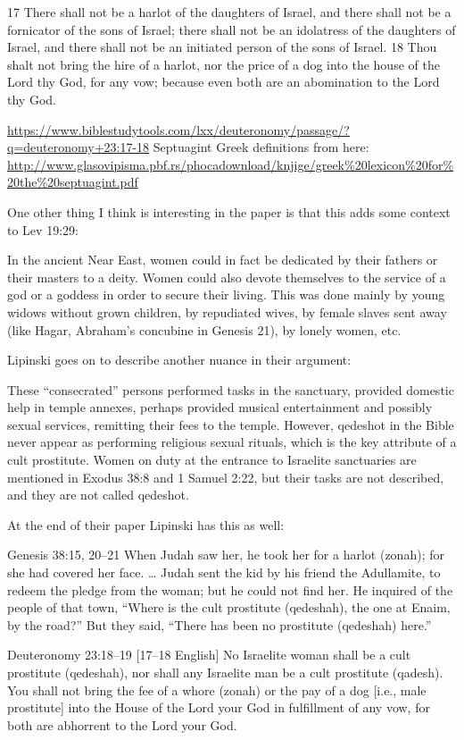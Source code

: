 \documentclass[11pt]{article}
\begin{document}
{17 There shall not be a harlot of the daughters of Israel, and there shall not be a fornicator of the sons of Israel; there shall not be an idolatress of the daughters of Israel, and there shall not be an initiated person of the sons of Israel. 18 Thou shalt not bring the hire of a harlot, nor the price of a dog into the house of the Lord thy God, for any vow; because even both are an abomination to the Lord thy God.

\url{https://www.biblestudytools.com/lxx/deuteronomy/passage/?q=deuteronomy+23:17-18}
Septuagint Greek definitions from here: \url{http://www.glasovipisma.pbf.rs/phocadownload/knjige/greek%20lexicon%20for%20the%20septuagint.pdf}

One other thing I think is interesting in the paper is that this adds some context to Lev 19:29:

In the ancient Near East, women could in fact be dedicated by their fathers or their masters to a deity. Women could also devote themselves to the service of a god or a goddess in order to secure their living. This was done mainly by young widows without grown children, by repudiated wives, by female slaves sent away (like Hagar, Abraham’s concubine in Genesis 21), by lonely women, etc.

Lipinski goes on to describe another nuance in their argument:

These “consecrated” persons performed tasks in the sanctuary, provided domestic help in temple annexes, perhaps provided musical entertainment and possibly sexual services, remitting their fees to the temple. However, qedeshot in the Bible never appear as performing religious sexual rituals, which is the key attribute of a cult prostitute. Women on duty at the entrance to Israelite sanctuaries are mentioned in Exodus 38:8 and 1 Samuel 2:22, but their tasks are not described, and they are not called qedeshot.


At the end of their paper Lipinski has this as well:

Genesis 38:15, 20–21
When Judah saw her, he took her for a harlot (zonah); for she had covered her face.
…
Judah sent the kid by his friend the Adullamite, to redeem the pledge from the woman; but he could not find her. He inquired of the people of that town, “Where is the cult prostitute (qedeshah), the one at Enaim, by the road?” But they said, “There has been no prostitute (qedeshah) here.”

Deuteronomy 23:18–19 [17–18 English]
No Israelite woman shall be a cult prostitute (qedeshah), nor shall any Israelite man be a cult prostitute (qadesh). You shall not bring the fee of a whore (zonah) or the pay of a dog [i.e., male prostitute] into the House of the Lord your God in fulfillment of any vow, for both are abhorrent to the Lord your God.

}
\end{document}
